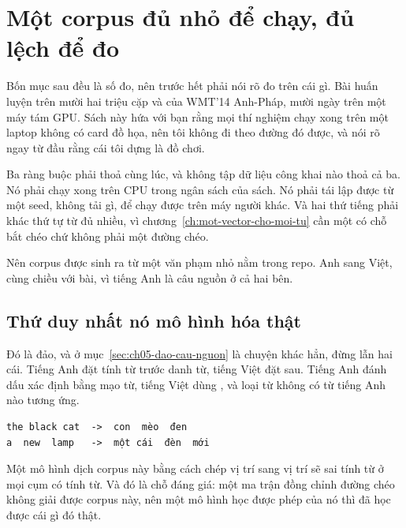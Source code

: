 \section{Một corpus đủ nhỏ để chạy, đủ lệch để đo}
\label{sec:ch05-corpus}

%
Bốn mục sau đều là số đo, nên trước hết phải nói rõ đo trên cái gì. Bài huấn
luyện trên mười hai triệu cặp  và
 của WMT'14 Anh-Pháp, mười ngày trên một máy tám
GPU.
Sách này hứa với bạn rằng mọi thí nghiệm chạy xong trên một laptop không có card
đồ họa, nên tôi không đi theo đường đó được, và nói rõ ngay từ đầu rằng cái tôi
dựng là đồ chơi.

Ba ràng buộc phải thoả cùng lúc, và không tập dữ liệu công khai nào thoả cả ba.
Nó phải chạy xong trên CPU trong ngân sách của sách. Nó phải tái lập được từ một
seed, không tải gì, để  chạy được trên máy người khác. Và hai
thứ tiếng phải khác thứ tự từ đủ nhiều, vì
chương~\ref{ch:mot-vector-cho-moi-tu} cần một
 có chỗ bắt chéo chứ không phải một
đường chéo.

Nên corpus được sinh ra từ một văn phạm nhỏ nằm trong repo. Anh sang Việt, cùng
chiều với bài, vì tiếng Anh là câu nguồn ở cả hai bên.

\subsection*{Thứ duy nhất nó mô hình hóa thật}

%
Đó là  đảo, và 
ở mục~\ref{sec:ch05-dao-cau-nguon} là chuyện khác hẳn, đừng lẫn hai cái. Tiếng
Anh đặt tính từ trước danh từ, tiếng Việt đặt sau. Tiếng Anh đánh dấu xác định
bằng mạo từ, tiếng Việt dùng , và loại từ không có từ
tiếng Anh nào tương ứng.

\begin{verbatim}
the black cat  ->  con  mèo  đen
a  new  lamp   ->  một cái  đèn  mới
\end{verbatim}

Một mô hình dịch corpus này bằng cách chép vị trí sang vị trí sẽ sai tính từ ở
mọi cụm có tính từ. Và đó là chỗ đáng giá: một ma trận đồng chỉnh đường chéo
không giải được corpus này, nên một mô hình học được phép
 của nó thì đã học được cái gì đó thật.

